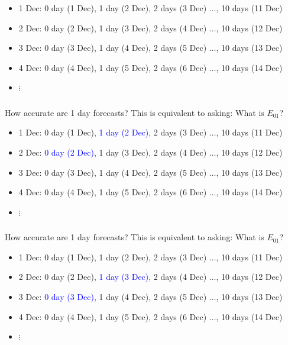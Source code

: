 \documentclass[aspectratio=169]{beamer}
\begin{document}
\begin{frame}
\frametitle{}

\begin{itemize}
\item 1 Dec: 0 day (1 Dec), 1 day (2 Dec), 2 days (3 Dec) $\ldots$, 10 days (11 Dec)
\pause
\item 2 Dec: 0 day (2 Dec), 1 day (3 Dec), 2 days (4 Dec) $\ldots$, 10 days (12 Dec)
\pause
\item 3 Dec: 0 day (3 Dec), 1 day (4 Dec), 2 days (5 Dec) $\ldots$, 10 days (13 Dec)
\pause
\item 4 Dec: 0 day (4 Dec), 1 day (5 Dec), 2 days (6 Dec) $\ldots$, 10 days (14 Dec)
\item $\vdots$
\end{itemize}

\end{frame}
\begin{frame}
\frametitle{}

How accurate are 1 day forecasts? This is equivalent to asking:  What is $E_{01}$?
\begin{itemize}
\item 1 Dec: 0 day (1 Dec), \textcolor{blue}{1 day (2 Dec)}, 2 days (3 Dec) $\ldots$, 10 days (11 Dec)
\item 2 Dec: \textcolor{blue}{0 day (2 Dec)}, 1 day (3 Dec), 2 days (4 Dec) $\ldots$, 10 days (12 Dec)
\item 3 Dec: 0 day (3 Dec), 1 day (4 Dec), 2 days (5 Dec) $\ldots$, 10 days (13 Dec)
\item 4 Dec: 0 day (4 Dec), 1 day (5 Dec), 2 days (6 Dec) $\ldots$, 10 days (14 Dec)
\item $\vdots$
\end{itemize}

\end{frame}
\begin{frame}
\frametitle{}

How accurate are 1 day forecasts? This is equivalent to asking:  What is $E_{01}$?
\begin{itemize}
\item 1 Dec: 0 day (1 Dec), 1 day (2 Dec), 2 days (3 Dec) $\ldots$, 10 days (11 Dec)
\item 2 Dec: 0 day (2 Dec), \textcolor{blue}{1 day (3 Dec)}, 2 days (4 Dec) $\ldots$, 10 days (12 Dec)
\item 3 Dec: \textcolor{blue}{0 day (3 Dec)}, 1 day (4 Dec), 2 days (5 Dec) $\ldots$, 10 days (13 Dec)
\item 4 Dec: 0 day (4 Dec), 1 day (5 Dec), 2 days (6 Dec) $\ldots$, 10 days (14 Dec)
\item $\vdots$
\end{itemize}

\end{frame}
\end{document}
